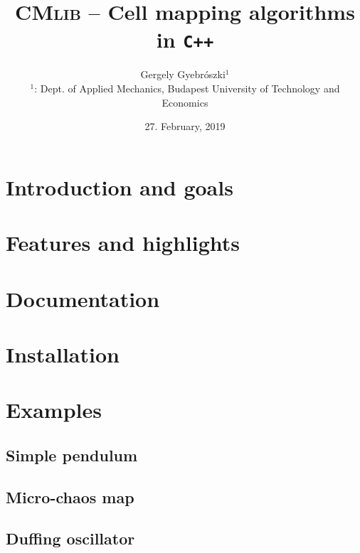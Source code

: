 \documentclass{article}
\title{\textsc{CMlib} -- Cell mapping algorithms in \texttt{C++}}
\author{Gergely Gyebrószki$^1$ \\
$^1$: Dept. of Applied Mechanics, Budapest University of Technology and Economics}
\date{27. February, 2019}
\begin{document}
\maketitle
	
\section{Introduction and goals}

\section{Features and highlights}

\section{Documentation}

\section{Installation}

\section{Examples}

\subsection{Simple pendulum}

\subsection{Micro-chaos map}

\subsection{Duffing oscillator}
\end{document}
